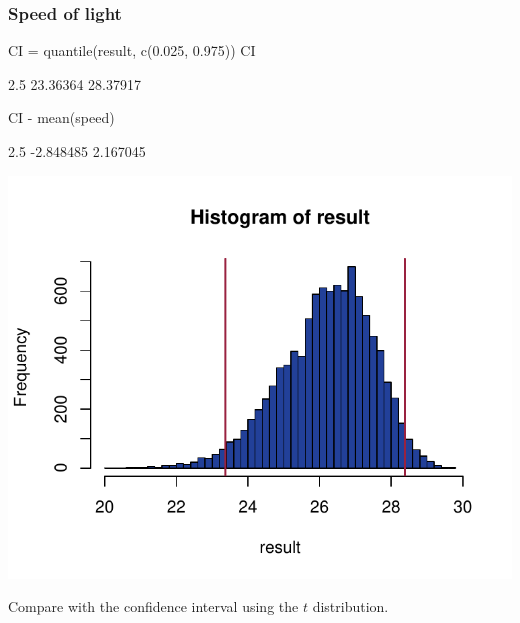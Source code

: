 \documentclass[a4paper]{article}
\begin{document}
\subsubsection{Speed of light}
\begin{Schunk}
\begin{Sinput}
CI = quantile(result, c(0.025, 0.975))
CI
\end{Sinput}
\begin{Soutput}
    2.5%
23.36364 28.37917 
\end{Soutput}
\begin{Sinput}
CI - mean(speed)
\end{Sinput}
\begin{Soutput}
     2.5%
-2.848485  2.167045 
\end{Soutput}


{\centering \includegraphics[width=\maxwidth]{figure/listings-unnamed-chunk-168-1} 

}

\end{Schunk}
Compare with the confidence interval using the \( t \) distribution.
\end{document}
